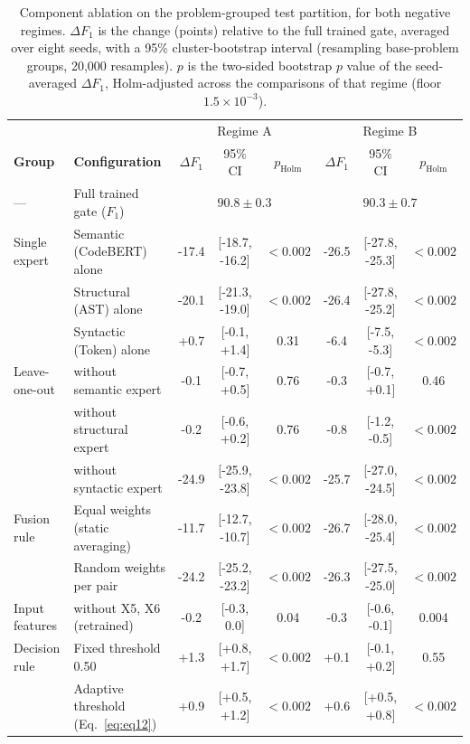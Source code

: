 \begin{table}[t]
\centering
\caption{Component ablation on the problem-grouped test partition, for both negative regimes. $\Delta F_1$ is the change (points) relative to the full trained gate, averaged over eight seeds, with a 95\% cluster-bootstrap interval (resampling base-problem groups, 20{,}000 resamples). $p$ is the two-sided bootstrap $p$ value of the seed-averaged $\Delta F_1$, Holm-adjusted across the comparisons of that regime (floor $1.5\times10^{-3}$).}
\label{tab:ablation}
\footnotesize
\begin{tabular}{ll|ccc|ccc}
\toprule
 & & \multicolumn{3}{c|}{Regime A} & \multicolumn{3}{c}{Regime B} \\
\textbf{Group} & \textbf{Configuration} & $\Delta F_1$ & 95\% CI & $p_{\mathrm{Holm}}$ & $\Delta F_1$ & 95\% CI & $p_{\mathrm{Holm}}$ \\
\midrule
--- & Full trained gate ($F_1$) & \multicolumn{3}{c|}{$90.8\pm0.3$} & \multicolumn{3}{c}{$90.3\pm0.7$} \\
\midrule
Single expert & Semantic (CodeBERT) alone & -17.4 & [-18.7, -16.2] & $<0.002$ & -26.5 & [-27.8, -25.3] & $<0.002$ \\
 & Structural (AST) alone & -20.1 & [-21.3, -19.0] & $<0.002$ & -26.4 & [-27.8, -25.2] & $<0.002$ \\
 & Syntactic (Token) alone & +0.7 & [-0.1, +1.4] & 0.31 & -6.4 & [-7.5, -5.3] & $<0.002$ \\
\midrule
Leave-one-out & without semantic expert & -0.1 & [-0.7, +0.5] & 0.76 & -0.3 & [-0.7, +0.1] & 0.46 \\
 & without structural expert & -0.2 & [-0.6, +0.2] & 0.76 & -0.8 & [-1.2, -0.5] & $<0.002$ \\
 & without syntactic expert & -24.9 & [-25.9, -23.8] & $<0.002$ & -25.7 & [-27.0, -24.5] & $<0.002$ \\
\midrule
Fusion rule & Equal weights (static averaging) & -11.7 & [-12.7, -10.7] & $<0.002$ & -26.7 & [-28.0, -25.4] & $<0.002$ \\
 & Random weights per pair & -24.2 & [-25.2, -23.2] & $<0.002$ & -26.3 & [-27.5, -25.0] & $<0.002$ \\
\midrule
Input features & without X5, X6 (retrained) & -0.2 & [-0.3, 0.0] & 0.04 & -0.3 & [-0.6, -0.1] & 0.004 \\
\midrule
Decision rule & Fixed threshold 0.50 & +1.3 & [+0.8, +1.7] & $<0.002$ & +0.1 & [-0.1, +0.2] & 0.55 \\
 & Adaptive threshold (Eq.~\ref{eq:eq12}) & +0.9 & [+0.5, +1.2] & $<0.002$ & +0.6 & [+0.5, +0.8] & $<0.002$ \\

\end{tabular}
\end{table}
